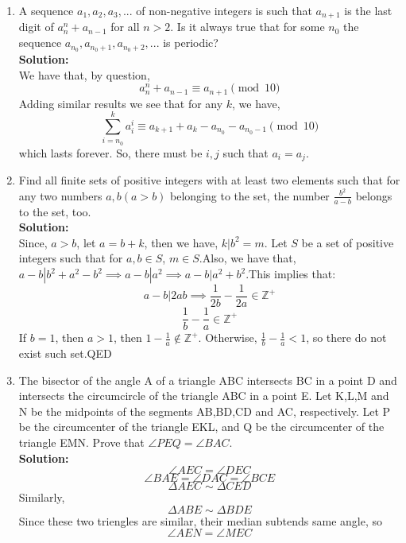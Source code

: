 \documentclass{article}
\begin{document}
\begin{enumerate}
\newpage

\item  A sequence $a_1,a_2,a_3,...$ of non-negative integers is such that $a_{n+1}$ is the last digit of $a_n^n + a_{n-1}$ for all $n > 2$. Is it always true that for some $n_0$ the sequence $a_{n_0},a_{n_{0}+1},a_{n_{0}+2},...$ is periodic?\\
\textbf{Solution:}\\
We have that, by question,
$$a_n^n + a_{n-1} \equiv a_{n+1} \pmod{10}$$
Adding similar results we see that for any $k$, we have,
$$\sum_{i=n_0}^{k} a_{i}^i \equiv a_{k+1}+a_{k}-a_{n_0}-a_{n_0-1} \pmod{10}$$
which lasts forever. So, there must be $i,j$ such that $a_{i}=a_{j}$.








\newpage

\item  Find all ﬁnite sets of positive integers with at least two elements such that for any two numbers $a, b (a > b)$ belonging to the set, the number $\frac{b^2}{a-b}$ belongs to the set, too.\\
\textbf{Solution:}\\
Since, $a>b$, let $a=b+k$, then we have,
$k|b^2=m$. Let $S$ be a set of positive integers such that for $a,b \in S$, $m \in S$.Also, we have that, $a-b|b^2+a^2-b^2 \implies a-b|a^2 \implies a-b|a^2+b^2$.This implies that:
$$a-b|2ab \implies \frac{1}{2b}-\frac{1}{2a} \in \mathbb{Z^+}$$
$$\frac{1}{b}-\frac{1}{a} \in \mathbb{Z^+}$$
If $b=1$, then $a>1$, then $1-\frac{1}{a} \not \in \mathbb{Z^+}$.
Otherwise, $\frac{1}{b}-\frac{1}{a} <1$, so there do not exist such set.QED









\newpage

\item  The bisector of the angle A of a triangle ABC intersects BC in a point D and intersects the circumcircle of the triangle ABC in a point E. Let K,L,M and N be the midpoints of the segments AB,BD,CD and AC, respectively. Let P be the circumcenter of the triangle EKL, and Q be the circumcenter of the triangle EMN. Prove that $\angle PEQ = \angle BAC.$\\
\textbf{Solution:}\\
$$\angle AEC = \angle DEC$$
$$\angle BAE= \angle DAC=\angle BCE$$
$$ \Delta AEC \sim\Delta CED$$
Similarly,
$$\Delta ABE \sim\Delta BDE$$
Since these two triengles are similar, their median subtends same angle, so
$$\angle AEN= \angle MEC$$



\end{enumerate}
\end{document}
